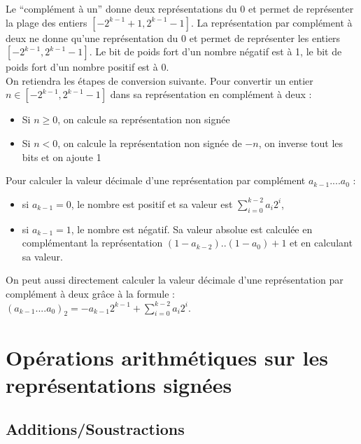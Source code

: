 Le ``complément à un'' donne deux représentations du $0$ et permet de représenter la plage des entiers $[-2^{k-1}+1, 2^{k-1}-1]$. La représentation par complément à deux ne donne qu'une représentation du $0$ et permet de représenter les entiers $[-2^{k-1}, 2^{k-1}-1]$. Le bit de poids fort d'un nombre négatif est à 1, le bit de poids fort d'un nombre positif est à 0.\\

On retiendra les étapes de conversion suivante. Pour convertir un entier $n \in [-2^{k-1}, 2^{k-1}-1]$ dans sa représentation en complément à deux :
\begin{itemize}
\item Si $n \geq 0$, on calcule sa représentation non signée
\item Si $n < 0$, on calcule la représentation non signée de $-n$, on inverse tout les bits et on ajoute 1
\end{itemize}
Pour calculer la valeur décimale d'une représentation par complément $a_{k-1}....a_0$ :
\begin{itemize}
\item si $a_{k-1} = 0$, le nombre est positif et sa valeur est $\sum_{i=0}^{k-2} a_i 2^i$,
\item si $a_{k-1} = 1$, le nombre est négatif. Sa valeur absolue est calculée en complémentant la représentation $(1-a_{k-2})..(1-a_0) + 1$ et en calculant sa valeur.
\end{itemize}
On peut aussi directement calculer la valeur décimale d'une représentation par complément à deux grâce à la formule : $(a_{k-1}....a_0)_2 = -a_{k-1}2^{k-1} + \sum_{i=0}^{k-2} a_i 2^i$.




\section{Opérations arithmétiques sur les représentations signées}


\subsection{Additions/Soustractions}

